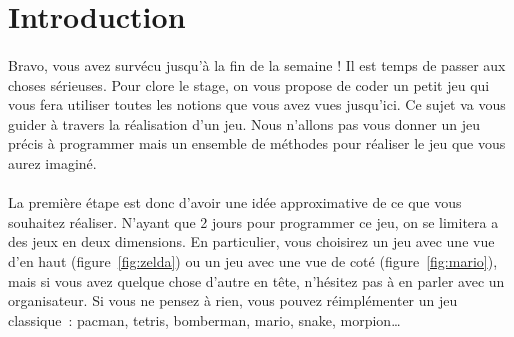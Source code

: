 
\section{Introduction}
\paragraph{}
Bravo, vous avez survécu jusqu'à la fin de la semaine !
Il est temps de passer aux choses sérieuses.
Pour clore le stage, on vous propose de coder un petit jeu qui vous fera utiliser toutes les notions que vous avez vues jusqu'ici. 
Ce sujet va vous guider à travers la réalisation d'un jeu.
Nous n'allons pas vous donner un jeu précis à programmer mais un ensemble de méthodes pour réaliser le jeu que vous aurez imaginé.

\paragraph{}
La première étape est donc d'avoir une idée approximative de ce que vous souhaitez réaliser.
N'ayant que 2 jours pour programmer ce jeu, on se limitera a des jeux en deux dimensions.
En particulier, vous choisirez un jeu avec une vue d'en haut (figure~\ref{fig:zelda}) ou un jeu avec une vue de coté (figure~\ref{fig:mario}), mais si vous avez quelque chose d'autre en tête, n'hésitez pas à en parler avec un organisateur.
Si vous ne pensez à rien, vous pouvez réimplémenter un jeu classique~: pacman, tetris, bomberman, mario, snake, morpion…

